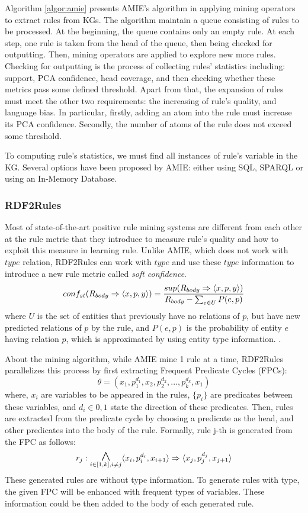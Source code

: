 Algorithm \ref{algor:amie} presents AMIE's algorithm in applying mining operators to extract rules from KGs. The algorithm maintain a queue consisting of rules to be processed. At the beginning, the queue contains only an empty rule. At each step, one rule is taken from the head of the queue, then being checked for outputting. Then, mining operators are applied to explore new more rules.
Checking for outputting is the process of collecting rules' statistics including: support, PCA confidence, head coverage, and then checking whether these metrics pass some defined threshold. Apart from that, the expansion of rules must meet the other two requirements: the increasing of rule's quality, and language bias. In particular, firstly, adding an atom into the rule must increase its PCA confidence. Secondly, the number of atoms of the rule does not exceed some threshold.

To computing rule's statistics, we must find all instances of rule's variable in the KG. Several options have been proposed by AMIE: either using SQL, SPARQL \cite{amie} or using an In-Memory Database.

\subsubsection{RDF2Rules}
Most of state-of-the-art positive rule mining systems are different from each other at the rule metric that they introduce to measure rule's quality and how to exploit this measure in learning rule.
Unlike AMIE, which does not work with $type$ relation, RDF2Rules \cite{rdf2rules} can work with $type$ and use these $type$ information to  introduce a new rule metric called \textit{soft confidence}.
\[conf_{st}(R_{body} \Rightarrow \langle x,p,y\rangle) = \frac{sup(R_{body} \Rightarrow \langle x,p,y\rangle)}{R_{body} - \sum_{e \in U}P(e,p)} \]
where $U$ is the set of entities that previously have no relations of $p$, but have new predicted relations of $p$ by the rule, and $P(e,p)$ is the probability of entity $e$ having relation $p$, which is approximated by using entity type information. \cite{rdf2rules}.

About the mining algorithm, while AMIE mine 1 rule at a time, RDF2Rules parallelizes this process by first extracting Frequent Predicate Cycles (FPCs):
\[\theta = (x_1, p_1^{d_1}, x_2, p_2^{d_2}, ..., p_k^{d_k}, x_1)\]
where, ${x_i}$ are variables to be appeared in the rules, $\{p_i\}$ are predicates between these variables, and ${d_i \in {0,1}}$ state the direction of these predicates. Then, rules are extracted from the predicate cycle by choosing a predicate as the head, and other predicates into the body of the rule. Formally, rule j-th is generated from the FPC as follows:
\[r_j: \underset{i \in [1,k], i \ne j}{\mathlarger{\mathlarger{\mathlarger{\wedge}}}} \tuple{x_i,p_i^{d_i},x_{i+1}} \Rightarrow \tuple{x_j,p_j^{d_j},x_{j+1}}\]
These generated rules are without type information. To generate rules with type, the given FPC will be enhanced with frequent types of variables. These information could be then added to the body of each generated rule.

